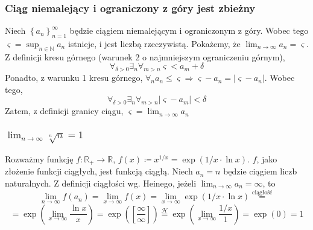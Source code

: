 \documentclass[11pt]{beamer}
\newcommand{\below}[1]{\displaystyle\mathop{#1}}
\begin{document}
\begin{frame}
\frametitle{Ciąg niemalejący i ograniczony z góry jest zbieżny}
Niech $\left\{a_n\right\}_{n = 1}^{\infty}$ będzie ciągiem niemalejącym i ograniczonym z góry. Wobec tego $\varsigma = \sup_{n \in \mathbb N} a_n$ istnieje, i jest liczbą rzeczywistą. Pokażemy, że $\lim_{n \rightarrow \infty} a_n = \varsigma$.
Z definicji kresu górnego (warunek 2 o najmniejszym ograniczeniu górnym),
\[
	\below{\forall}_{\delta > 0} \below{\exists}_n \below{\forall}_{m > n} \varsigma < a_m + \delta
\]
Ponadto, z warunku 1 kresu górnego, $\below{\forall}_{n}a_n \leq \varsigma \Rightarrow \varsigma - a_n = |\varsigma - a_n |$.
Wobec tego,
\[
	\below{\forall}_{\delta > 0} \below{\exists}_n \below{\forall}_{m > n} |\varsigma - a_m | < \delta
\]
Zatem, z definicji granicy ciągu, $\varsigma = \displaystyle\mathop{\lim}_{n \rightarrow \infty}a_n$
\end{frame}
\begin{frame}
\frametitle{$\lim_{n \rightarrow \infty}\sqrt[n]n = 1$}
Rozważmy funkcję $f: \mathbb{R_+} \rightarrow \mathbb{R}$, $f(x) \coloneqq x^{1/x} = \exp (1/x \cdot \ln x)$. $f$, jako złożenie funkcji ciągłych, jest funkcją ciągłą. Niech $a_n = n$ będzie ciągiem liczb naturalnych. Z definicji ciągłości wg. Heinego, jeżeli $\lim_{n \rightarrow \infty} a_n = \infty$, to 
\[
	\lim_{n \rightarrow \infty}f(a_n) = \lim_{x \rightarrow \infty}f(x) = \lim_{x\rightarrow \infty} \exp (1/x \cdot \ln x) \stackrel{\text{ciągłość}}{=} 
\]
\[
	= \exp \left(\lim_{x\rightarrow \infty}\frac{\ln x}x \right) = \exp\left(\left[\frac \infty \infty \right]\right) \stackrel{\mathcal{H}}{=} \exp \left( \lim_{x\rightarrow \infty}\frac{1/x}{1} \right) = \exp(0) = 1
\]
\end{frame}
\end{document}
